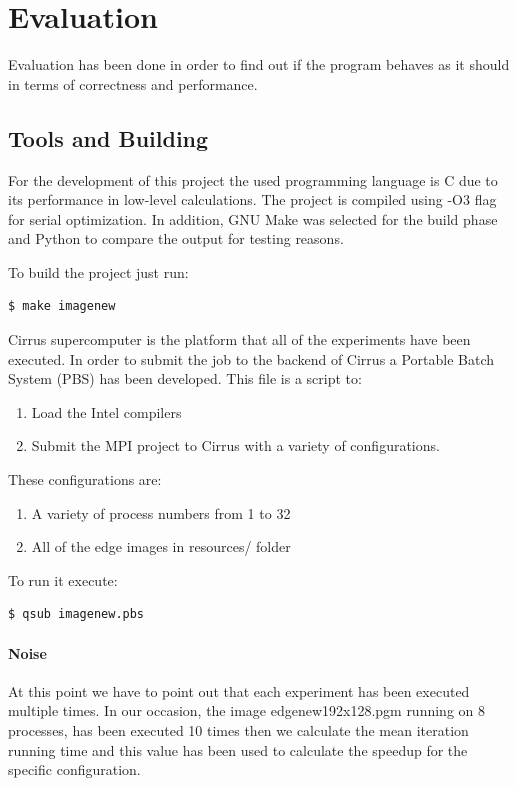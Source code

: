\documentclass[12pt,a4paper]{article}
\newcommand{\sectionVspacing}{\vspace{15pt}}
\begin{document}
\sectionVspacing

\section{Evaluation}
    Evaluation has been done in order to find out if the program behaves as it should in terms of correctness and performance.

    \subsection{Tools and Building}
        For the development of this project the used programming language is C due to its performance in low-level calculations. The project is compiled using -O3 flag for serial optimization. In addition, GNU Make was selected for the build phase and Python to compare the output for testing reasons.
        
        To build the project just run:
        \begin{lstlisting}[language=bash]
          $ make imagenew
        \end{lstlisting}

        Cirrus supercomputer is the platform that all of the experiments have been executed. In order to submit the job to the backend of Cirrus a Portable Batch System (PBS) has been developed. This file is a script to:
        \begin{enumerate}
          \item Load the Intel compilers
          \item Submit the MPI project to Cirrus with a variety of configurations.
        \end{enumerate}

        These configurations are:
        \begin{enumerate}
          \item A variety of process numbers from 1 to 32
          \item All of the edge images in resources/ folder
        \end{enumerate}

        To run it execute:
        \begin{lstlisting}[language=bash]
          $ qsub imagenew.pbs
        \end{lstlisting}

        \paragraph{Noise}
            At this point we have to point out that each experiment has been executed multiple times. In our occasion, the image edgenew192x128.pgm running on 8 processes, has been executed 10 times then we calculate the mean iteration running time and this value has been used to calculate the speedup for the specific configuration.
\end{document}
